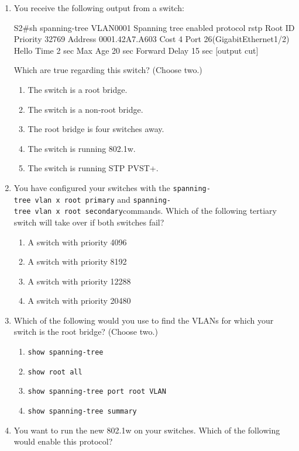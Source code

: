 \begin{enumerate}
\item
  You receive the following output from a switch:

\begin{cli}
S2#sh spanning-tree
VLAN0001
  Spanning tree enabled protocol rstp
  Root ID    Priority    32769
             Address     0001.42A7.A603
             Cost        4
             Port        26(GigabitEthernet1/2)
             Hello Time  2 sec  Max Age 20 sec  Forward Delay 15 sec
[output cut]
\end{cli}

  Which are true regarding this switch? (Choose two.)

  \begin{enumerate}
    \item
    The switch is a root bridge.
  \item
    The switch is a non-root bridge.
  \item
    The root bridge is four switches away.
  \item
    The switch is running 802.1w.
  \item
    The switch is running STP PVST+.
  \end{enumerate}
\item
  You have configured your switches with the
  \texttt{spanning-tree\ vlan\ x\ root\ primary} and
  \texttt{spanning-tree\ vlan\ x\ root\ secondary}commands. Which of the
  following tertiary switch will take over if both switches fail?

  \begin{enumerate}
    \item
    A switch with priority 4096
  \item
    A switch with priority 8192
  \item
    A switch with priority 12288
  \item
    A switch with priority 20480
  \end{enumerate}
\item
  Which of the following would you use to find the VLANs for which your
  switch is the root bridge? (Choose two.)

  \begin{enumerate}
    \item
    \texttt{show\ spanning-tree}
  \item
    \texttt{show\ root\ all}
  \item
    \texttt{show\ spanning-tree\ port\ root\ VLAN}
  \item
    \texttt{show\ spanning-tree\ summary}
  \end{enumerate}
\item
  You want to run the
  new 802.1w on your switches. Which of the following would enable this
  protocol?


\end{enumerate}
